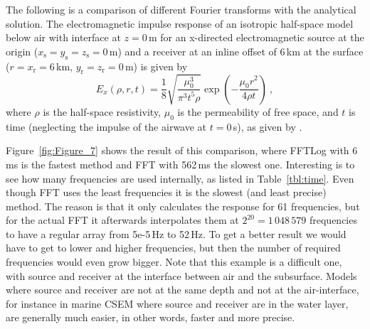 \documentclass[manuscript,revised]{geophysics}
\begin{document}
The following is a comparison of different Fourier transforms with the
analytical solution. The electromagnetic impulse response of an isotropic
half-space model below air with interface at $z=0\,$m for an x-directed
electromagnetic source at the origin
($x_\textrm{s}=y_\textrm{s}=z_\textrm{s}=0\,$m) and a receiver at an inline
offset of 6\,km at the surface ($r = x_\textrm{r}=6\,$km,
$y_\textrm{r}=z_\textrm{r}=0\,$m) is given by
%
\begin{equation}
  E_x(\rho,r,t) = \frac{1}{8} \sqrt{\frac{\mu_0^3}{\pi^3 t^5 \rho}}
                    \exp\left(-\frac{\mu_0 r^2}{4\rho t}\right)\ ,
  \label{eq:impulse}
\end{equation}
%
where $\rho$ is the half-space resistivity, $\mu_0$ is the permeability of free
space, and $t$ is time (neglecting the impulse of the airwave at $t=0\,$s), as
given by \citet[][ eq. 5.38]{PhD.97.Wilson}.

Figure~\ref{fig:Figure_7} shows the result of this comparison, where FFTLog with
6\,ms is the fastest method and FFT with 562\,ms the slowest one. Interesting
is to see how many frequencies are used internally, as listed in
Table~\ref{tbl:time}.
%
%
%
Even though FFT uses the least frequencies it is the slowest (and least
precise) method. The reason is that it only calculates the response for 61
frequencies, but for the actual FFT it afterwards interpolates them at $2^{20}
= 1\,048\,579$ frequencies to have a regular array from 5e-5\,Hz to 52\,Hz. To
get a better result we would have to get to lower and higher frequencies, but
then the number of required frequencies would even grow bigger. Note that this
example is a difficult one, with source and receiver at the interface between
air and the subsurface. Models where source and receiver are not at the same
depth and not at the air-interface, for instance in marine CSEM where source
and receiver are in the water layer, are generally much easier, in other words,
faster and more precise.
%
%
\end{document}
